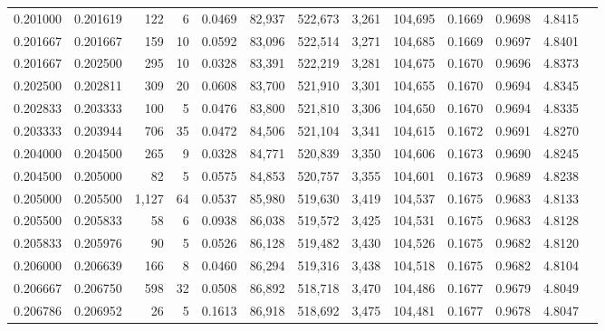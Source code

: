 \begin{tabular}{rrrrrrrrrrrrr}
0.201000 & 0.201619 &   122 &   6 &                                     0.0469 &  82,937 & 522,673 &   3,261 & 104,695 & 0.1669 & 0.9698 & 4.8415 \\
0.201667 & 0.201667 &   159 &  10 &                                     0.0592 &  83,096 & 522,514 &   3,271 & 104,685 & 0.1669 & 0.9697 & 4.8401 \\
0.201667 & 0.202500 &   295 &  10 &                                     0.0328 &  83,391 & 522,219 &   3,281 & 104,675 & 0.1670 & 0.9696 & 4.8373 \\
0.202500 & 0.202811 &   309 &  20 &                                     0.0608 &  83,700 & 521,910 &   3,301 & 104,655 & 0.1670 & 0.9694 & 4.8345 \\
0.202833 & 0.203333 &   100 &   5 &                                     0.0476 &  83,800 & 521,810 &   3,306 & 104,650 & 0.1670 & 0.9694 & 4.8335 \\
0.203333 & 0.203944 &   706 &  35 &                                     0.0472 &  84,506 & 521,104 &   3,341 & 104,615 & 0.1672 & 0.9691 & 4.8270 \\
0.204000 & 0.204500 &   265 &   9 &                                     0.0328 &  84,771 & 520,839 &   3,350 & 104,606 & 0.1673 & 0.9690 & 4.8245 \\
0.204500 & 0.205000 &    82 &   5 &                                     0.0575 &  84,853 & 520,757 &   3,355 & 104,601 & 0.1673 & 0.9689 & 4.8238 \\
0.205000 & 0.205500 & 1,127 &  64 &                                     0.0537 &  85,980 & 519,630 &   3,419 & 104,537 & 0.1675 & 0.9683 & 4.8133 \\
0.205500 & 0.205833 &    58 &   6 &                                     0.0938 &  86,038 & 519,572 &   3,425 & 104,531 & 0.1675 & 0.9683 & 4.8128 \\
0.205833 & 0.205976 &    90 &   5 &                                     0.0526 &  86,128 & 519,482 &   3,430 & 104,526 & 0.1675 & 0.9682 & 4.8120 \\
0.206000 & 0.206639 &   166 &   8 &                                     0.0460 &  86,294 & 519,316 &   3,438 & 104,518 & 0.1675 & 0.9682 & 4.8104 \\
0.206667 & 0.206750 &   598 &  32 &                                     0.0508 &  86,892 & 518,718 &   3,470 & 104,486 & 0.1677 & 0.9679 & 4.8049 \\
0.206786 & 0.206952 &    26 &   5 &                                     0.1613 &  86,918 & 518,692 &   3,475 & 104,481 & 0.1677 & 0.9678 & 4.8047 \\

\end{tabular}
